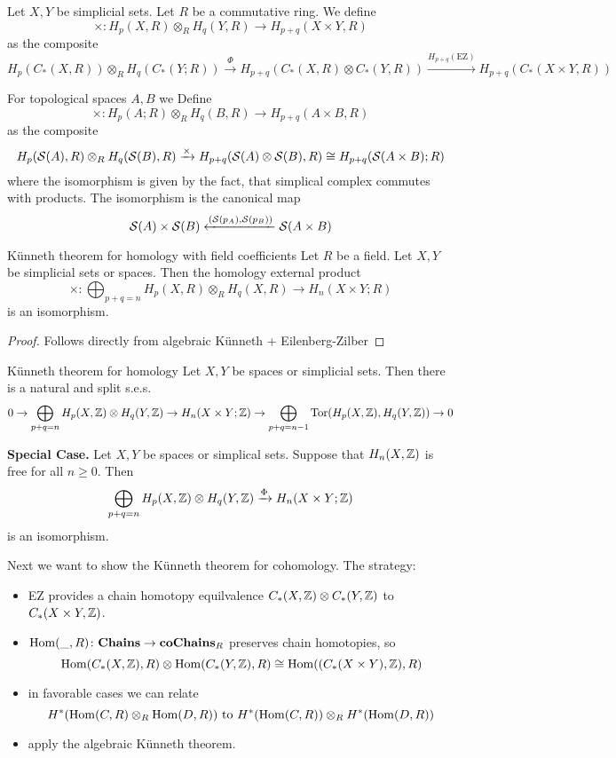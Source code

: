 \documentclass[language=english]{TemplateLecture}
\begin{document}
\begin{construction}
    Let \(X,Y\) be simplicial sets. Let \(R\) be a commutative ring. We define
    \[\times \colon H_p(X,R) \otimes_R H_q(Y,R) \to H_{p+q} (X\times Y, R)\]
    as the composite
    \[H_p(C_*(X,R)) \otimes_R H_q(C_*(Y; R)) \xrightarrow{\Phi} H_{p+q}(C_*(X, R) \otimes C_*(Y,R)) \xrightarrow{H_{p+q}(\mathrm{EZ})} H_{p+q}(C_*(X\times Y, R))\]
    
    For topological spaces \(A,B\) we Define
    \[\times \colon H_p(A; R) \otimes _R H_q(B,R) \to H_{p+q}(A\times B, R)\]
    as the composite
    \[H_p(\mathcal{S}(A),R) \otimes_R H_q(\mathcal{S}(B),R) \xrightarrow{\times} H_{p+q}(\mathcal{S}(A) \otimes \mathcal{S}(B), R) \cong H_{p+q}(\mathcal{S}(A\times B); R)\]
    where the isomorphism is given by the fact, that simplical complex commutes with products. The isomorphism is the canonical map
    \[\mathcal{S}(A) \times \mathcal{S}(B) \xleftarrow{(\mathcal{S}(p_A), \mathcal{S}(p_B))} \mathcal{S}(A\times B)\]
\end{construction}

\begin{thm}{Künneth theorem for homology with field coefficients}{}
    Let \(R\) be a field. Let \(X,Y\) be simplicial sets or spaces. Then the homology external product
    \[\times \colon \bigoplus_{p+q = n} H_p(X,R) \otimes_R H_q(X,R) \to H_n(X\times Y; R)\]
    is an isomorphism.
\end{thm}

\begin{proof}
    Follows directly from algebraic Künneth + Eilenberg-Zilber
\end{proof}

\begin{thm}{Künneth theorem for homology}{}
    Let \(X,Y\) be spaces or simplicial sets. Then there is a natural and split s.e.s. 
    \[0 \to \bigoplus_{p+q = n} H_p(X, \mathbb{Z}) \otimes H_q(Y, \mathbb{Z}) \to H_n(X\times Y; \mathbb{Z}) \to \bigoplus_{p+q = n-1} \mathrm{Tor}(H_p(X,\mathbb{Z}) , H_q(Y, \mathbb{Z})) \to 0\]
\end{thm}

\textbf{Special Case.} Let \(X, Y\) be spaces or simplical sets. Suppose that \(H_n(X, \mathbb{Z})\) is free for all \(n \geq 0\). Then
\[\bigoplus_{p+q = n} H_p(X, \mathbb{Z}) \otimes H_q(Y, \mathbb{Z}) \xrightarrow{\Phi} H_n(X\times Y; \mathbb{Z})\]
is an isomorphism.

Next we want to show the Künneth theorem for cohomology. The strategy:
\begin{itemize}
    \item EZ provides a chain homotopy equilvalence \(C_*(X, \mathbb{Z}) \otimes C_*(Y, \mathbb{Z})\) to \(C_*(X\times Y, \mathbb{Z})\).
    \item \(\operatorname{Hom}(\_, R) \colon \mathbf{Chains} \to \mathbf{coChains}_R\) preserves chain homotopies, so
    \[\operatorname{Hom}(C_*(X, \mathbb{Z}), R) \otimes \operatorname{Hom}(C_*(Y, \mathbb{Z}), R) \cong \operatorname{Hom}((C_*(X\times Y), \mathbb{Z}), R)\]
    \item in favorable cases we can relate
    \[H^*(\operatorname{Hom}(C, R) \otimes_R \operatorname{Hom}(D, R)) \text{ to } H^*(\operatorname{Hom}(C,R)) \otimes_R H^*(\operatorname{Hom}(D,R))\]
    \item apply the algebraic Künneth theorem.
\end{itemize}
\end{document}
